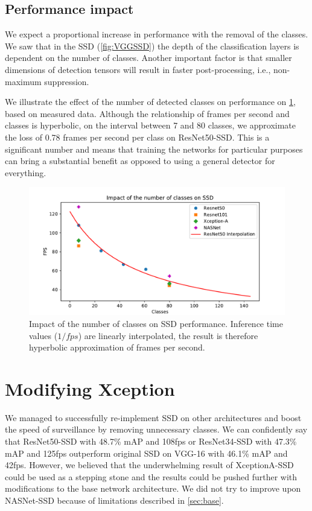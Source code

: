 \subsection{Performance impact}
We expect a proportional increase in performance with the removal of the classes. We saw that in the SSD (\cref{fig:VGGSSD}) the depth of the classification layers is dependent on the number of classes. Another important factor is that smaller dimensions of detection tensors will result in faster post-processing, i.e., non-maximum suppression. 

We illustrate the effect of the number of detected classes on performance on \cref{fig:fpscls}, based on measured data. Although the relationship of frames per second and classes is hyperbolic, on the interval between 7 and 80 classes, we approximate the loss of 0.78 frames per second per class on ResNet50-SSD. This is a significant number and means that training the networks for particular purposes can bring a substantial benefit as opposed to using a general detector for everything.

\begin{figure}
    \centering
    \includegraphics[width=\textwidth]{img/fps_cls}
    \caption[Impact of the number of classes on SSD performance]{Impact of the number of classes on SSD performance. Inference time values ($1/fps$) are linearly interpolated, the result is therefore hyperbolic approximation of frames per second.}
    \label{fig:fpscls}
\end{figure}


\section{Modifying Xception}
\label{sec:fixxception}
We managed to successfully re-implement SSD on other architectures and boost the speed of surveillance by removing unnecessary classes. We can confidently say that ResNet50-SSD with 48.7\% mAP and 108fps or ResNet34-SSD with 47.3\% mAP and 125fps outperform original SSD on VGG-16 with 46.1\% mAP and 42fps. However, we believed that the underwhelming result of XceptionA-SSD could be used as a stepping stone and the results could be pushed further with modifications to the base network architecture. We did not try to improve upon NASNet-SSD because of limitations described in \cref{sec:base}.

